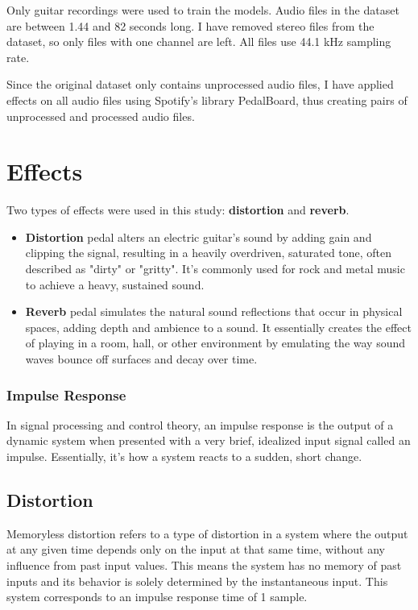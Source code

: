 \documentclass[masterthesis]{fer}
\begin{document}
Only guitar recordings were used to train the models. Audio files in the dataset are between 1.44 and 82 seconds long. I have removed stereo files from the dataset, so only files with one channel are left. All files use 44.1 kHz sampling rate.

Since the original dataset only contains unprocessed audio files, I have applied effects on all audio files using Spotify's library PedalBoard, thus creating pairs of unprocessed and processed audio files.

\section{Effects}
Two types of effects were used in this study: \textbf{distortion} and \textbf{reverb}.
\begin{itemize}
    \item \textbf{Distortion} pedal alters an electric guitar's sound by adding gain and clipping the signal, resulting in a heavily overdriven, saturated tone, often described as "dirty" or "gritty". It's commonly used for rock and metal music to achieve a heavy, sustained sound.
    \item \textbf{Reverb} pedal simulates the natural sound reflections that occur in physical spaces, adding depth and ambience to a sound. It essentially creates the effect of playing in a room, hall, or other environment by emulating the way sound waves bounce off surfaces and decay over time. 
\end{itemize}

\subsubsection{Impulse Response}


In signal processing and control theory, an impulse response is the output of a dynamic system when presented with a very brief, idealized input signal called an impulse. Essentially, it's how a system reacts to a sudden, short change. 

\subsection{Distortion}
Memoryless distortion refers to a type of distortion in a system where the output at any given time depends only on the input at that same time, without any influence from past input values. This means the system has no memory of past inputs and its behavior is solely determined by the instantaneous input. This system corresponds to an impulse response time of 1 sample.
\end{document}

